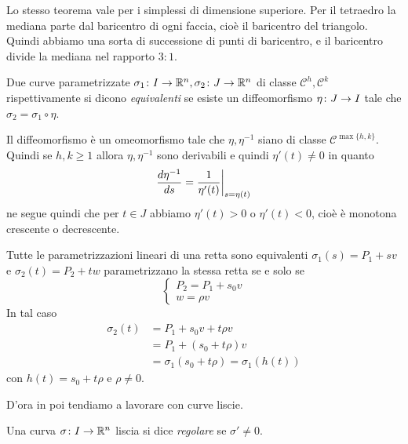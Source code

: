 \documentclass[a4paper]{article}
\begin{document}
Lo stesso teorema vale per i simplessi di dimensione superiore.
Per il tetraedro la mediana parte dal baricentro di ogni faccia, cioè
il baricentro del triangolo. Quindi abbiamo una sorta di successione di punti di baricentro,
e il baricentro divide la mediana nel rapporto \(3:1\).

\begin{snippetdefinition}{}
    Due curve parametrizzate \(\sigma_1 \colon I \to \mathbb{R}^n, \sigma_2 \colon J \to \mathbb{R}^n\) di classe \(\mathcal C^h, \mathcal C^k\)
    rispettivamente si dicono \emph{equivalenti}
    se esiste un diffeomorfismo \(\eta \colon J \to I\) tale che \(\sigma_2 = \sigma_1 \circ \eta\).
\end{snippetdefinition}

Il diffeomorfismo è un omeomorfismo tale che \(\eta,\eta^{-1}\) siano di classe \(\mathcal C^{\max\{h,k\}}\).
Quindi se \(h,k \geq 1\) allora \(\eta,\eta^{-1}\) sono derivabili e quindi
\(\eta'(t) \neq 0\) in quanto
\[
    \frac{d\eta^{-1}}{ds} = \restr{\frac{1}{\eta'(t)}}{s = \eta(t)}
\]
ne segue quindi che per \(t \in J\) abbiamo \(\eta'(t) > 0\) o \(\eta'(t) < 0\),
cioè è monotona crescente o decrescente.

\begin{snippetexample}{Tutte le parametrizzazioni lineari di una retta sono equivalenti}
    \(\sigma_1(s) = P_1 + sv\) e \(\sigma_2(t) = P_2 + tw\)
    parametrizzano la stessa retta se e solo se
    \[
        \begin{cases}
            P_2 = P_1 + s_0v \\
            w = \rho v
        \end{cases}
    \]
    In tal caso \begin{align*}
        \sigma_2(t) &= P_1 + s_0 v + t\rho v \\
        &= P_1 + (s_0 + t\rho)v \\
        &= \sigma_1(s_0 + t\rho) = \sigma_1(h(t))
    \end{align*}
    con \(h(t) = s_0 + t\rho\) e \(\rho \neq 0\).
\end{snippetexample}

D'ora in poi tendiamo a lavorare con curve liscie.

\begin{snippetdefinition}{}
    Una curva \(\sigma \colon I \to \mathbb{R}^n\) liscia si dice
    \emph{regolare} se \(\sigma' \neq 0\).
\end{snippetdefinition}
\end{document}
